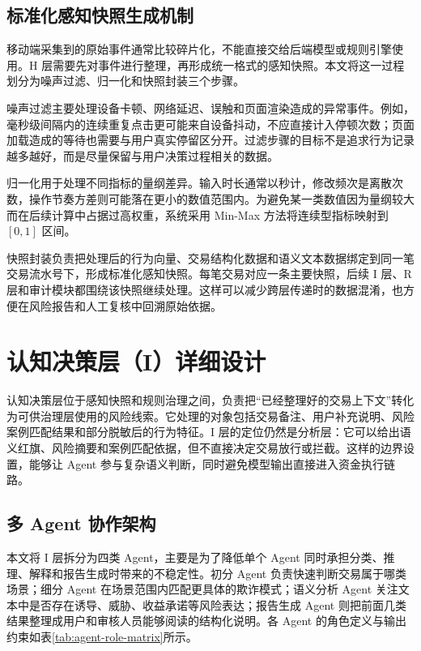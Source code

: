 \documentclass{xduugthesis}
\begin{document}
\subsection{标准化感知快照生成机制}

移动端采集到的原始事件通常比较碎片化，不能直接交给后端模型或规则引擎使用。H 层需要先对事件进行整理，再形成统一格式的感知快照。本文将这一过程划分为噪声过滤、归一化和快照封装三个步骤。

噪声过滤主要处理设备卡顿、网络延迟、误触和页面渲染造成的异常事件。例如，毫秒级间隔内的连续重复点击更可能来自设备抖动，不应直接计入停顿次数；页面加载造成的等待也需要与用户真实停留区分开。过滤步骤的目标不是追求行为记录越多越好，而是尽量保留与用户决策过程相关的数据。

归一化用于处理不同指标的量纲差异。输入时长通常以秒计，修改频次是离散次数，操作节奏方差则可能落在更小的数值范围内。为避免某一类数值因为量纲较大而在后续计算中占据过高权重，系统采用 Min-Max 方法将连续型指标映射到 $[0,1]$ 区间。

快照封装负责把处理后的行为向量、交易结构化数据和语义文本数据绑定到同一笔交易流水号下，形成标准化感知快照。每笔交易对应一条主要快照，后续 I 层、R 层和审计模块都围绕该快照继续处理。这样可以减少跨层传递时的数据混淆，也方便在风险报告和人工复核中回溯原始依据。

\section{认知决策层（I）详细设计}

认知决策层位于感知快照和规则治理之间，负责把“已经整理好的交易上下文”转化为可供治理层使用的风险线索。它处理的对象包括交易备注、用户补充说明、风险案例匹配结果和部分脱敏后的行为特征。I 层的定位仍然是分析层：它可以给出语义红旗、风险摘要和案例匹配依据，但不直接决定交易放行或拦截。这样的边界设置，能够让 Agent 参与复杂语义判断，同时避免模型输出直接进入资金执行链路。

\subsection{多 Agent 协作架构}

本文将 I 层拆分为四类 Agent，主要是为了降低单个 Agent 同时承担分类、推理、解释和报告生成时带来的不稳定性。初分 Agent 负责快速判断交易属于哪类场景；细分 Agent 在场景范围内匹配更具体的欺诈模式；语义分析 Agent 关注文本中是否存在诱导、威胁、收益承诺等风险表达；报告生成 Agent 则把前面几类结果整理成用户和审核人员能够阅读的结构化说明。各 Agent 的角色定义与输出约束如表\ref{tab:agent-role-matrix}所示。
\end{document}
